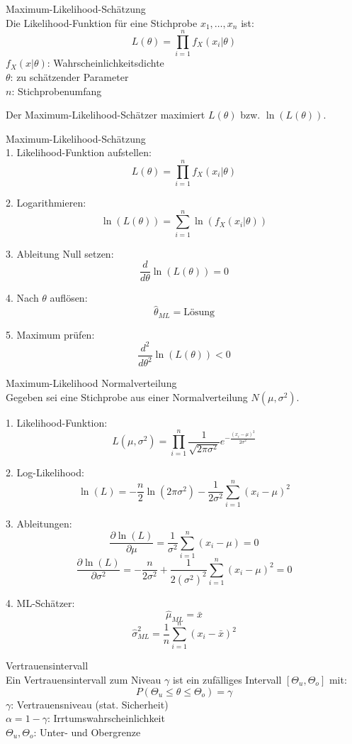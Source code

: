 \begin{definition}{Maximum-Likelihood-Schätzung}\\
Die Likelihood-Funktion für eine Stichprobe $x_1,\ldots,x_n$ ist:
$$
L(\theta)=\prod_{i=1}^n f_X(x_i|\theta)
$$
$f_X(x|\theta)$: Wahrscheinlichkeitsdichte\\
$\theta$: zu schätzender Parameter\\
$n$: Stichprobenumfang

Der Maximum-Likelihood-Schätzer maximiert $L(\theta)$ bzw. $\ln(L(\theta))$.
\end{definition}

\begin{KR}{Maximum-Likelihood-Schätzung}\\
1. Likelihood-Funktion aufstellen:
   $$L(\theta)=\prod_{i=1}^n f_X(x_i|\theta)$$

2. Logarithmieren:
   $$\ln(L(\theta))=\sum_{i=1}^n \ln(f_X(x_i|\theta))$$

3. Ableitung Null setzen:
   $$\frac{d}{d\theta}\ln(L(\theta))=0$$

4. Nach $\theta$ auflösen:
   $$\hat{\theta}_{ML}=\text{Lösung}$$

5. Maximum prüfen:
   $$\frac{d^2}{d\theta^2}\ln(L(\theta)) < 0$$
\end{KR}

\begin{example2}{Maximum-Likelihood Normalverteilung}\\
Gegeben sei eine Stichprobe aus einer Normalverteilung $N(\mu,\sigma^2)$.

1. Likelihood-Funktion:
$$L(\mu,\sigma^2)=\prod_{i=1}^n \frac{1}{\sqrt{2\pi\sigma^2}}e^{-\frac{(x_i-\mu)^2}{2\sigma^2}}$$

2. Log-Likelihood:
$$\ln(L)=-\frac{n}{2}\ln(2\pi\sigma^2)-\frac{1}{2\sigma^2}\sum_{i=1}^n(x_i-\mu)^2$$

3. Ableitungen:
$$\frac{\partial \ln(L)}{\partial \mu}=\frac{1}{\sigma^2}\sum_{i=1}^n(x_i-\mu)=0$$
$$\frac{\partial \ln(L)}{\partial \sigma^2}=-\frac{n}{2\sigma^2}+\frac{1}{2(\sigma^2)^2}\sum_{i=1}^n(x_i-\mu)^2=0$$

4. ML-Schätzer:
$$\hat{\mu}_{ML}=\bar{x}$$
$$\hat{\sigma}^2_{ML}=\frac{1}{n}\sum_{i=1}^n(x_i-\bar{x})^2$$
\end{example2}

\begin{definition}{Vertrauensintervall}\\
Ein Vertrauensintervall zum Niveau $\gamma$ ist ein zufälliges Intervall $[\Theta_u,\Theta_o]$ mit:
$$
P(\Theta_u \leq \theta \leq \Theta_o)=\gamma
$$
$\gamma$: Vertrauensniveau (stat. Sicherheit)\\
$\alpha=1-\gamma$: Irrtumswahrscheinlichkeit\\
$\Theta_u, \Theta_o$: Unter- und Obergrenze
\end{definition}

